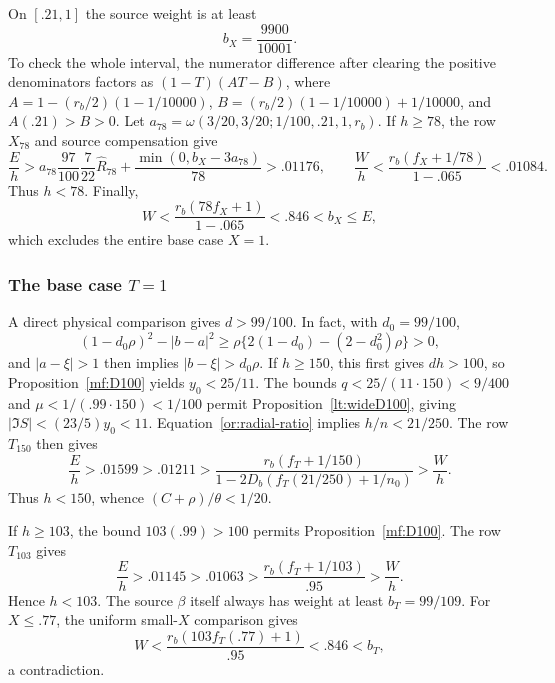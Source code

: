 On $[.21,1]$ the source weight is at least
\[
                   b_X=\frac{9900}{10001}.
\]
To check the whole interval, the numerator difference after clearing
the positive denominators factors as $(1-T)(AT-B)$, where
$A=1-(r_b/2)(1-1/10000)$,
$B=(r_b/2)(1-1/10000)+1/10000$, and $A(.21)>B>0$.
Let
$a_{78}=\omega(3/20,3/20;1/100,.21,1,r_b)$.
If $h\ge78$, the row $X_{78}$ and source compensation give
\[
 \frac Eh>
 a_{78}\frac{97}{100}\frac7{22}\widehat R_{78}
            +\frac{\min(0,b_X-3a_{78})}{78}>.01176,
 \qquad
 \frac Wh<\frac{r_b(f_X+1/78)}{1-.065}<.01084.
\]
Thus $h<78$.  Finally,
\[
              W<\frac{r_b(78f_X+1)}{1-.065}<.846<b_X\le E,
\]
which excludes the entire base case $X=1$.

\subsubsection{The base case $T=1$}

A direct physical comparison gives $d>99/100$.  In fact, with
$d_0=99/100$,
\[
 (1-d_0\rho)^2-|b-a|^2
 \ge\rho\{2(1-d_0)-(2-d_0^2)\rho\}>0,
\]
and $|a-\xi|>1$ then implies $|b-\xi|>d_0\rho$.
If $h\ge150$, this first gives $dh>100$, so
Proposition~\ref{mf:D100} yields $y_0<25/11$.  The bounds
$q<25/(11\cdot150)<9/400$ and
$\mu<1/(.99\cdot150)<1/100$ permit Proposition~\ref{lt:wideD100},
giving $|\Im S|<(23/5)y_0<11$.
Equation~\eqref{or:radial-ratio} implies $h/n<21/250$.
The row $T_{150}$ then gives
\[
 \frac Eh>.01599>.01211>
 \frac{r_b(f_T+1/150)}{1-2D_b(f_T(21/250)+1/n_0)}>\frac Wh.
\]
Thus $h<150$, whence $(C+\rho)/\theta<1/20$.

If $h\ge103$, the bound $103(.99)>100$ permits
Proposition~\ref{mf:D100}.
The row $T_{103}$ gives
\[
 \frac Eh>.01145>.01063>
              \frac{r_b(f_T+1/103)}{.95}>\frac Wh.
\]
Hence $h<103$.  The source $\beta$ itself always has weight at least
$b_T=99/109$.  For $X\le.77$, the uniform small-$X$ comparison
gives
\[
            W<\frac{r_b(103f_T(.77)+1)}{.95}<.846<b_T,
\]
a contradiction.


